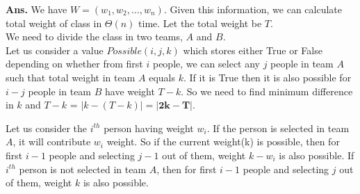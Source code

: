 \documentclass[11pt]{article}
\begin{document}
\hfill
   
\noindent \textbf{Ans.}
We have $W=(w_1,w_2,\ldots,w_n)$. Given this information, we can calculate total weight of class in $\Theta(n)$ time. Let the total weight be $T$.\\
We need to divide the class in two teams, $A$ and $B$.\\
Let us consider a value $Possible(i,j,k)$ which stores either True or False depending on whether from first $i$ people, we can select any $j$ people in team $A$ such that total weight in team $A$ equals $k$. If it is True then it is also possible for $i-j$ people in team $B$ have weight $T-k$. So we need to find minimum difference in $k$ and $T-k$ = $|k-(T-k)| =\mathbf{|2k-T|}$.

Let us consider the $i^{th}$ person having weight $w_i$. If the person is selected in team $A$, it will contribute $w_i$ weight. So if the current weight(k) is possible, then for first $i-1$ people and selecting $j-1$ out of them, weight $k-w_i$ is also possible. If $i^{th}$ person is not selected in team $A$, then for first $i-1$ people and selecting $j$ out of them, weight $k$ is also possible.
\end{document}
